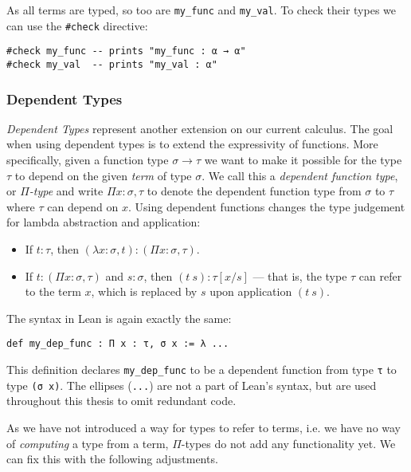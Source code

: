 \noindent As all terms are typed, so too are \lstinline{my_func} and \lstinline{my_val}.
To check their types we can use the \verb|#check| directive:

\begin{lstlisting}
#check my_func -- prints "my_func : α → α"
#check my_val  -- prints "my_val : α"
\end{lstlisting}

\subsubsection{Dependent Types}
\label{section:dependent-types}

\emph{Dependent Types} represent another extension on our current calculus.
The goal when using dependent types is to extend the expressivity of functions.
More specifically, given a function type $\sigma \to \tau$ we want to make it possible for the type $\tau$ to depend on the given \emph{term} of type $\sigma$.
We call this a \emph{dependent function type}, or \emph{$\Pi$-type} and write $\Pi x : \sigma, \tau$ to denote the dependent function type from $\sigma$ to $\tau$ where $\tau$ can depend on $x$. 
Using dependent functions changes the type judgement for lambda abstraction and application:

\begin{itemize}
  \item If $t : \tau$, then $(\lambda x : \sigma, t) : (\Pi x : \sigma, \tau)$.
  \item If $t : (\Pi x : \sigma, \tau)$ and $s : \sigma$, then $(t\ s) : \tau[x / s]$ --- that is, the type $\tau$ can refer to the term $x$, which is replaced by $s$ upon application $(t\ s)$.
\end{itemize}

\noindent The syntax in Lean is again exactly the same:

\begin{lstlisting}
def my_dep_func : Π x : τ, σ x := λ ...
\end{lstlisting}

\noindent This definition declares \lstinline{my_dep_func} to be a dependent function from type \lstinline{τ} to type \lstinline{(σ x)}.
The ellipses (\lstinline{...}) are not a part of Lean's syntax, but are used throughout this thesis to omit redundant code.

As we have not introduced a way for types to refer to terms, i.e. we have no way of \emph{computing} a type from a term, $\Pi$-types do not add any functionality yet.
We can fix this with the following adjustments.

